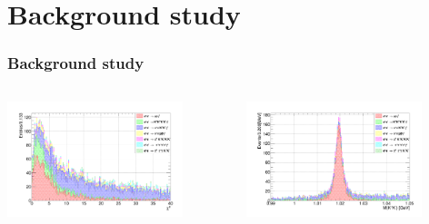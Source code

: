\documentclass[aspectratio=169]{ctexbeamer}
\begin{document}
\begin{frame}
\begin{columns}
\begin{column}{0.33\textwidth}
    \end{column}
  \end{columns}
\end{frame}


\section{Background study}
\begin{frame}
  \frametitle{Background study}
  \begin{columns}
    \begin{column}{0.5\textwidth}
      \centering
      \includegraphics[width=0.8\textwidth]{figures/bkg_chisq.png}
    \end{column}
    \begin{column}{0.5\textwidth}
      \centering
      \includegraphics[width=0.8\textwidth]{figures/bkg_phi.png}
    \end{column}
  \end{columns}


\end{frame}
\end{document}

